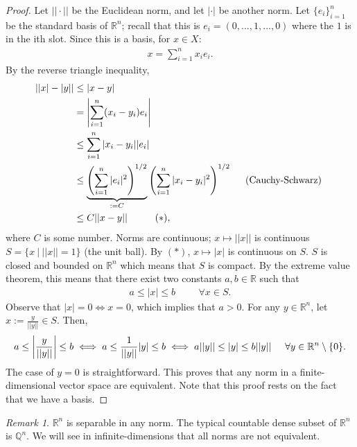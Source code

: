 \documentclass[psamsfonts]{amsart}
\theoremstyle{definition}
\theoremstyle{remark}
\newtheorem{rem}[thm]{Remark}
\newcommand{\Q}[0]{\mathbb{Q}}
\newcommand{\R}[0]{\mathbb{R}}
\numberwithin{equation}{section}
\begin{document}
\begin{proof}
	Let \( || \cdot || \) be the Euclidean norm, and let \( | \cdot | \) be another norm. Let \( \{ e_i \}_{i=1}^n \) be the standard basis of \( \R^n \); recall that this is \( e_i = (0, ..., 1, ... , 0 ) \) where the \( 1 \) is in the ith slot. Since this is a basis, for \( x \in X \): 
	\begin{align*}
		x = \sum_{i=1}^n x_i e_i.
	\end{align*}
	By the reverse triangle inequality, 
	\begin{align*}
		| |x| - |y| | & \leq |x-y | \\
					 & = \left| \sum_{i=1}^n (x_i - y_i) e_i \right| \\
					 & \leq \sum_{i=1}^n |x_i - y_i| |e_i| \\
					 & \leq \underbrace{ \left( \sum_{i=1}^n |e_i|^2  \right)^{1/2} }_{:= C} \left( \sum_{i=1}^n |x_i - y_i|^2   \right)^{1/2} \hspace{0.5cm} \text{(Cauchy-Schwarz) } \\
					 & \leq C ||x-y|| \hspace{1cm} (*),
	\end{align*}
	where \( C \) is some number. Norms are continuous; \( x \mapsto || x || \) is continuous \( S = \{ x\ |\ || x|| = 1 \} \) (the unit ball). By \( (*) \), \( x \mapsto | x | \) is continuous on \(  S \). \( S \) is closed and bounded on \( \R^n \) which means that \( S \) is compact. By the extreme value theorem, this means that there exist two constants \( a, b \in \R \) such that
	\begin{align}
		a \leq |x | \leq b \hspace{1cm} \forall x \in S.	
	\end{align}
	Observe that \( | x | = 0 \iff x = 0 \), which implies that \( a > 0 \). For any \( y \in \R^n \), let \( x := \frac{y}{||y||} \in S \). Then, 
	\begin{align*}
		a \leq \left| \frac{y}{||y||}  \right| \leq b \iff a \leq \frac{1}{||y ||} |y| \leq b \iff a || y || \leq |y| \leq b || y || \hspace{0.5cm} \forall y \in \R^n \setminus \{ 0 \}.
	\end{align*}
	The case of \( y = 0 \) is straightforward. This proves that any norm in a finite-dimensional vector space are equivalent. Note that this proof rests on the fact that we have a basis.
\end{proof}

\begin{rem}
	\( \R^n \) is separable in any norm. The typical countable dense subset of \( \R^n \) is \( \Q^n \). We will see in infinite-dimensions that all norms are not equivalent.
\end{rem}
\end{document}
